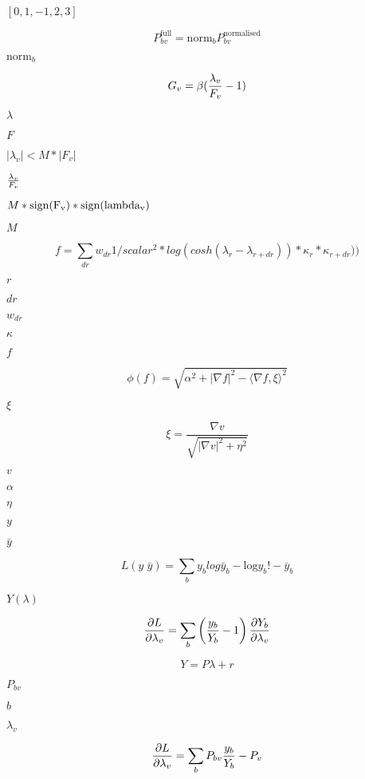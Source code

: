 \documentclass{article}
\begin{document}
$ [0, 1, -1, 2, 3 ] $
\pagebreak

\[ P^\mathrm{full}_{bv} = \mathrm{norm}_b P^\mathrm{normalised}_{bv} \]
\pagebreak

$\mathrm{norm}_b $
\pagebreak

\[ G_v = \beta ( {\lambda_v \over F_v} - 1) \]
\pagebreak

$ \lambda$
\pagebreak

$F$
\pagebreak

$|\lambda_v| < M*|F_v| $
\pagebreak

${\lambda_v \over F_v}$
\pagebreak

$M*\rm{sign}(F_v)*\rm{sign}(lambda_v)$
\pagebreak

$M$
\pagebreak

\[ f = \sum_{dr} w_{dr} 1/scalar^2 * log(cosh(\lambda_r - \lambda_{r+dr})) * \kappa_r * \kappa_{r+dr})) \]
\pagebreak

$r$
\pagebreak

$dr$
\pagebreak

$w_{dr}$
\pagebreak

$\kappa$
\pagebreak

$ f $
\pagebreak

\[ \phi(f) = \sqrt{\alpha^2 + |\nabla f|^2 - {\langle\nabla f,\xi\rangle}^2} \]
\pagebreak

$ \xi $
\pagebreak

\[ \xi = \frac{\nabla v}{\sqrt{|\nabla v|^2 + \eta^2}} \]
\pagebreak

$ v $
\pagebreak

$ \alpha $
\pagebreak

$ \eta $
\pagebreak

$y$
\pagebreak

$\bar y$
\pagebreak

\[ L(y\;\bar y) = \sum_b y_b log \bar y_b - \mathrm{log} y_b! - \bar y_b \]
\pagebreak

$Y(\lambda)$
\pagebreak

\[ {\partial L \over \partial \lambda_v} = \sum_b \left( {y_b \over Y_b} - 1 \right) {\partial Y_b \over \partial \lambda_v } \]
\pagebreak

\[ Y = P \lambda + r \]
\pagebreak

$P_{bv}$
\pagebreak

$b$
\pagebreak

$\lambda_v$
\pagebreak

\[ {\partial L \over \partial \lambda_v} = \sum_b P_{bv} {y_b \over Y_b} - P_v \]
\pagebreak
\end{document}
